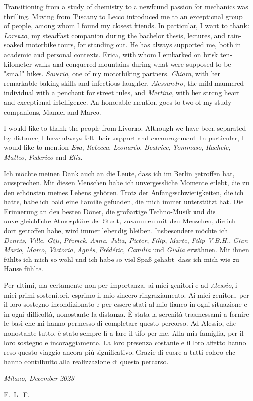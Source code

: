 \documentclass{Configuration_Files/PoliMi3i_thesis}
\begin{document}
Transitioning from a study of chemistry to a newfound passion for mechanics was thrilling. Moving from Tuscany to Lecco introduced me to an exceptional group of people, among whom I found my closest friends. In particular, I want to thank: \textit{Lorenzo}, my steadfast companion during the bachelor thesis, lectures, and rain-soaked motorbike tours, for standing out. He has always supported me, both in academic and personal contexts. Erica, with whom I embarked on brisk ten-kilometer walks and conquered mountains during what were supposed to be "small" hikes. \textit{Saverio}, one of my motorbiking partners. \textit{Chiara}, with her remarkable baking skills and infectious laughter. \textit{Alessandro}, the mild-mannered individual with a penchant for street rules, and \textit{Martina}, with her strong heart and exceptional intelligence. An honorable mention goes to two of my study companions, Manuel and Marco.

I would like to thank the people from Livorno. Although we have been separated by distance, I have always felt their support and encouragement. In particular, I would like to mention \textit{Eva}, \textit{Rebecca}, \textit{Leonardo}, \textit{Beatrice}, \textit{Tommaso}, \textit{Rachele}, \textit{Matteo}, \textit{Federico} and \textit{Elia}.

Ich möchte meinen Dank auch an die Leute, dass ich im Berlin getroffen hat, aussprechen. Mit diesen Menschen habe ich unvergessliche Momente erlebt, die zu den schönsten meines Lebens gehören. Trotz der Anfangsschwierigkeiten, die ich hatte, habe ich bald eine Familie gefunden, die mich immer unterstützt hat. Die Erinnerung an den besten Döner, die großartige Techno-Musik und die unvergleichliche Atmosphäre der Stadt, zusammen mit den Menschen, die ich dort getroffen habe, wird immer lebendig bleiben. Insbesondere möchte ich \textit{Dennis}, \textit{Ville}, \textit{Gijs}, \textit{P\v{r}emek}, \textit{Anna}, \textit{Julia}, \textit{Pieter}, \textit{Filip}, \textit{Marte}, \textit{Filip V.B.H.}, \textit{Gian Mario}, \textit{Marco}, \textit{Victoria}, \textit{Agnès}, \textit{Frédéric}, \textit{Camilia} und \textit{Giulia} erwähnen. Mit ihnen fühlte ich mich so wohl und ich habe so viel Spaß gehabt, dass ich mich wie zu Hause fühlte.

Per ultimi, ma certamente non per importanza, ai miei genitori e ad \textit{Alessio}, i miei primi sostenitori, esprimo il mio sincero ringraziamento. Ai miei genitori, per il loro sostegno incondizionato e per essere stati al mio fianco in ogni situazione e in ogni difficoltà, nonostante la distanza. È stata la serenità trasmessami a fornire le basi che mi hanno permesso di completare questo percorso. Ad Alessio, che nonostante tutto, è stato sempre lì a fare il tifo per me. Alla mia famiglia, per il loro sostegno e incoraggiamento. La loro presenza costante e il loro affetto hanno reso questo viaggio ancora più significativo. Grazie di cuore a tutti coloro che hanno contribuito alla realizzazione di questo percorso.

\noindent\textit{Milano, December 2023}

\begin{flushright}
    \hfill F.~L.~F.
\end{flushright}

\cleardoublepage
\end{document}
